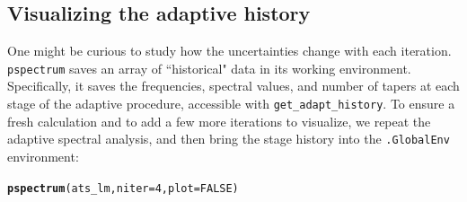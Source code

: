 \documentclass[10pt]{article}\usepackage{graphicx, color}
\makeatletter
\newcommand{\hlfunctioncall}[1]{\textcolor[rgb]{0.501960784313725,0,0.329411764705882}{\textbf{#1}}}%
\newenvironment{kframe}{%
 \def\at@end@of@kframe{}%
 \ifinner\ifhmode%
  \def\at@end@of@kframe{\end{minipage}}%
  \begin{minipage}{\columnwidth}%
 \fi\fi%
 \def\FrameCommand##1{\hskip\@totalleftmargin \hskip-\fboxsep
 \colorbox{shadecolor}{##1}\hskip-\fboxsep
     \hskip-\linewidth \hskip-\@totalleftmargin \hskip\columnwidth}%
 \MakeFramed {\advance\hsize-\width
   \@totalleftmargin\z@ \linewidth\hsize
   \@setminipage}}%
 {\par\unskip\endMakeFramed%
 \at@end@of@kframe}
\newenvironment{knitrout}{}{} %
\newcommand{\Rcmd}[1]{\texttt{#1}}
\makeatother
\begin{document}
\subsection{Visualizing the adaptive history}
One might be curious to study how the
uncertainties change with each iteration.
\Rcmd{pspectrum}
 saves an array of ``historical" data in its working environment.
 Specifically, it saves the frequencies,
 spectral values, and number of tapers at each stage of the adaptive
 procedure, accessible with \Rcmd{get\_adapt\_history}.
 To ensure a fresh calculation and to 
 add a few more iterations to visualize, 
we repeat the adaptive spectral analysis, 
and then bring the stage history into the \Rcmd{.GlobalEnv} environment:
\begin{knitrout}
\color{fgcolor}\begin{kframe}
\begin{alltt}
\hlfunctioncall{pspectrum}(ats_lm, niter = 4, plot = FALSE)
\end{alltt}


{\ttfamily\noindent\itshape\color{messagecolor}{\#\# Stage\ \ 0 est. (pilot)}}

{\ttfamily\noindent\itshape\color{messagecolor}{\#\# 	environment\ \ ** .psdEnv **\ \ refreshed}}

{\ttfamily\noindent\itshape\color{messagecolor}{\#\# detrending (and demeaning)}}

{\ttfamily\noindent\itshape\color{messagecolor}{\#\# Stage\ \ 1 est. (Ave. S.V.R. -22.4 dB)}}

{\ttfamily\noindent\itshape\color{messagecolor}{\#\# Stage\ \ 2 est. (Ave. S.V.R. -46.4 dB)}}

{\ttfamily\noindent\itshape\color{messagecolor}{\#\# Stage\ \ 3 est. (Ave. S.V.R. -44.2 dB)}}

{\ttfamily\noindent\itshape\color{messagecolor}{\#\# Stage\ \ 4 est. (Ave. S.V.R. -44.3 dB)}}


\end{kframe}
\end{knitrout}
\end{document}
